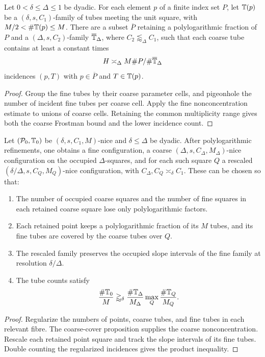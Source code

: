 \begin{proposition}
\label{prop:os-thick-cover}
Let $0<\delta\leq\Delta\leq1$ be dyadic. For each element $p$
of a finite index set $P$, let $\mathbb{T}(p)$ be a
$(\delta,s,C_1)$-family of tubes meeting the unit square, with
$M/2<\#\mathbb{T}(p)\leq M$. There are a subset
$\overline P$ retaining a polylogarithmic fraction of $P$ and a
$(\Delta,s,C_2)$-family $\overline{\mathbb{T}}_\Delta$, where
$C_2\lessapprox_\Delta C_1$, such that each coarse tube contains
at least a constant times
\[
                         H\asymp_\Delta
                         M\#P/\#\overline{\mathbb{T}}_\Delta
\]
incidences $(p,T)$ with $p\in\overline P$ and $T\in\mathbb{T}(p)$.
\end{proposition}
\begin{proof}
Group the fine tubes by their coarse parameter cells, and pigeonhole
the number of incident fine tubes per coarse cell. Apply the fine
nonconcentration estimate to unions of coarse cells. Retaining the
common multiplicity range gives both the coarse Frostman bound and
the lower incidence count.
\end{proof}

\begin{proposition}
\label{prop:os-induction}
Let $(\mathcal{P}_0,\mathbb{T}_0)$ be $(\delta,s,C_1,M)$-nice and
$\delta\leq\Delta$ be dyadic. After polylogarithmic refinements,
one obtains a fine configuration, a coarse
$(\Delta,s,C_\Delta,M_\Delta)$-nice configuration on the occupied
$\Delta$-squares, and for each such square $Q$ a rescaled
$(\delta/\Delta,s,C_Q,M_Q)$-nice configuration, with
$C_\Delta,C_Q\asymp_\delta C_1$. These can be chosen so that:
\begin{enumerate}
\item The number of occupied coarse squares and the number of fine
squares in each retained coarse square lose only polylogarithmic factors.
\item Each retained point keeps a polylogarithmic fraction of its
$M$ tubes, and its fine tubes are covered by the coarse tubes over $Q$.
\item The rescaled family preserves the occupied slope intervals
of the fine family at resolution $\delta/\Delta$.
\item The tube counts satisfy
\[
 \frac{\#\mathbb{T}_0}{M}\gtrapprox_\delta
       \frac{\#\mathbb{T}_\Delta}{M_\Delta}
       \max_Q\frac{\#\mathbb{T}_Q}{M_Q}.
\]
\end{enumerate}
\end{proposition}
\begin{proof}
Regularize the numbers of points, coarse tubes, and fine tubes in
each relevant fibre. The coarse-cover proposition supplies the
coarse nonconcentration. Rescale each retained point square and
track the slope intervals of its fine tubes. Double counting the
regularized incidences gives the product inequality.
\end{proof}

